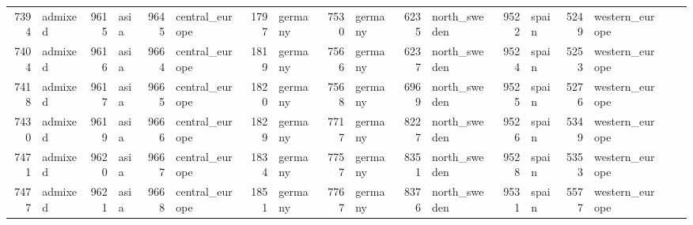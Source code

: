 \begin{table}[h]
{\begin{tabular}{rl|rl|rl|rl|rl|rl|rl|rl|rl}
			7394                   & admixed         & 9615                   & asia            & 9645                   & central\_europe & 1797                   & germany         & 7530                   & germany                 & 6235                   & north\_sweden           & 9522                   & spain           & 5249                   & western\_europe &                          &                 \\
			7404                   & admixed         & 9616                   & asia            & 9664                   & central\_europe & 1819                   & germany         & 7566                   & germany                 & 6237                   & north\_sweden           & 9524                   & spain           & 5253                   & western\_europe &                          &                 \\
			7418                   & admixed         & 9617                   & asia            & 9665                   & central\_europe & 1820                   & germany         & 7568                   & germany                 & 6969                   & north\_sweden           & 9525                   & spain           & 5276                   & western\_europe &                          &                 \\
			7430                   & admixed         & 9619                   & asia            & 9666                   & central\_europe & 1829                   & germany         & 7717                   & germany                 & 8227                   & north\_sweden           & 9526                   & spain           & 5349                   & western\_europe &                          &                 \\
			7471                   & admixed         & 9620                   & asia            & 9667                   & central\_europe & 1834                   & germany         & 7757                   & germany                 & 8351                   & north\_sweden           & 9528                   & spain           & 5353                   & western\_europe &                          &                 \\
			7477                   & admixed         & 9621                   & asia            & 9668                   & central\_europe & 1851                   & germany         & 7767                   & germany                 & 8376                   & north\_sweden           & 9531                   & spain           & 5577                   & western\_europe &                          &                 \\

\end{tabular}}
\end{table}
